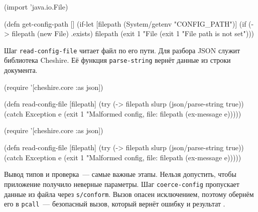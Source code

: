 \else

\begin{english}
  \begin{clojure}
(import 'java.io.File)

(defn get-config-path []
  (if-let [filepath (System/getenv "CONFIG_PATH")]
    (if (-> filepath (new File) .exists)
      filepath
      (exit 1 "File %
    (exit 1 "File path is not set")))
  \end{clojure}
\end{english}

\fi

Шаг \verb|read-config-file| читает файл по его пути. Для разбора JSON служит
библиотека Cheshire. Её функция \verb|parse-string| вернёт данные из строки
документа.


\ifnarrow

\begin{english}
  \begin{clojure}
(require '[cheshire.core :as json])

(defn read-config-file
  [filepath]
  (try
    (-> filepath
        slurp
        (json/parse-string true))
    (catch Exception e
      (exit 1
        "Malformed config,
                   file: %
            filepath (ex-message e)))))
  \end{clojure}
\end{english}

\else

\begin{english}
  \begin{clojure}
(require '[cheshire.core :as json])

(defn read-config-file
  [filepath]
  (try
    (-> filepath slurp (json/parse-string true))
    (catch Exception e
      (exit 1 "Malformed config, file: %
            filepath (ex-message e)))))
  \end{clojure}
\end{english}

\fi


Вывод типов и проверка~--- самые важные этапы. Нельзя допустить, чтобы
приложение получило неверные параметры. Шаг \verb|coerce-config| пропускает
данные из файла через \verb|s/conform|. Вызов опасен исключением, поэтому
обернём его в \verb|pcall|~--- безопасный вызов, который вернёт ошибку и
результат .

